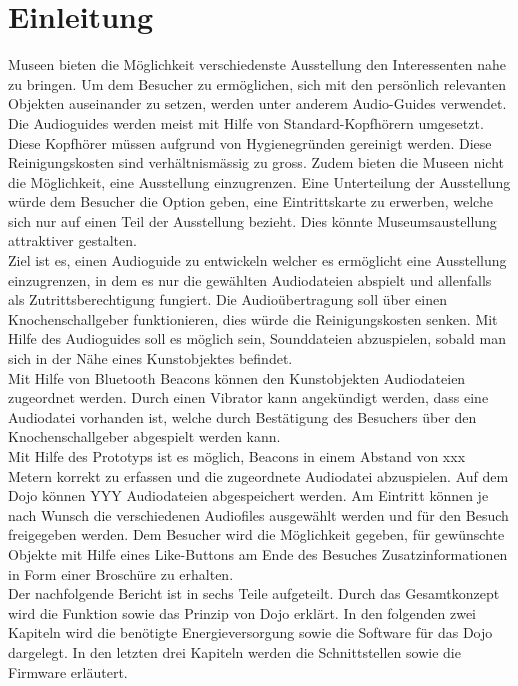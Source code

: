 \chapter{Einleitung}
\thispagestyle{fancy}  \setcounter{page}{1} \cfoot{\thepage} \renewcommand{\footrulewidth}{0.4pt} 
Museen bieten die Möglichkeit verschiedenste Ausstellung den Interessenten nahe zu bringen. Um dem Besucher zu ermöglichen, sich mit den persönlich relevanten Objekten auseinander zu setzen, werden unter anderem Audio-Guides verwendet. Die Audioguides werden meist mit Hilfe von Standard-Kopfhörern umgesetzt. Diese Kopfhörer müssen aufgrund von Hygienegründen gereinigt werden. Diese Reinigungskosten sind verhältnismässig zu gross. Zudem bieten die Museen nicht die Möglichkeit, eine Ausstellung einzugrenzen. Eine Unterteilung der Ausstellung würde dem Besucher die Option geben, eine Eintrittskarte zu erwerben, welche sich nur auf einen Teil der Ausstellung bezieht. Dies könnte Museumsaustellung attraktiver gestalten.\\

Ziel ist es, einen Audioguide zu entwickeln welcher es ermöglicht eine Ausstellung einzugrenzen, in dem es nur die gewählten Audiodateien abspielt und allenfalls als Zutrittsberechtigung fungiert. Die Audioübertragung soll über einen Knochenschallgeber funktionieren, dies würde die Reinigungskosten senken. Mit Hilfe des Audioguides soll es möglich sein, Sounddateien abzuspielen, sobald man sich in der Nähe eines Kunstobjektes befindet.\\

Mit Hilfe von Bluetooth Beacons können den Kunstobjekten Audiodateien zugeordnet werden. Durch einen Vibrator kann angekündigt werden, dass eine Audiodatei vorhanden ist, welche durch Bestätigung des Besuchers über den Knochenschallgeber abgespielt werden kann.\\

Mit Hilfe des Prototyps ist es möglich, Beacons in einem Abstand von xxx Metern korrekt zu erfassen und die zugeordnete Audiodatei abzuspielen. Auf dem Dojo können YYY Audiodateien abgespeichert werden. Am Eintritt können je nach Wunsch die verschiedenen Audiofiles ausgewählt werden und für den Besuch freigegeben werden. Dem Besucher wird die Möglichkeit gegeben, für gewünschte Objekte mit Hilfe eines Like-Buttons am Ende des Besuches Zusatzinformationen in Form einer Broschüre zu erhalten.\\

Der nachfolgende Bericht ist in sechs Teile aufgeteilt. Durch das Gesamtkonzept wird die Funktion sowie das Prinzip von Dojo erklärt. In den folgenden zwei Kapiteln wird die benötigte Energieversorgung sowie die Software für das Dojo dargelegt. In den letzten drei Kapiteln werden die Schnittstellen sowie die Firmware erläutert. 